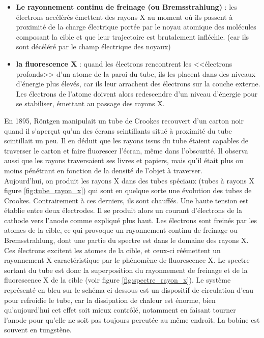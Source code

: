 \begin{itemize}
    \item \textbf{Le rayonnement continu de freinage (ou Bremsstrahlung)} : les électrons accélérés émettent des rayons X au moment où ils passent à proximité de la charge électrique portée par le noyau atomique des molécules composant la cible et que leur trajectoire est brutalement infléchie. (car ils sont décéléré par le champ électrique des noyaux)
    \item \textbf{la fluorescence X} : quand les électrons rencontrent les <<électrons profonds>> d'un atome de la paroi du tube, ils les placent dans des niveaux d'énergie plus élevés, car ils leur arrachent des électrons sur la couche externe. Les électrons de l'atome doivent alors redescendre d'un niveau d'énergie pour se stabiliser, émettant au passage des rayons X.
\end{itemize}

En 1895, Röntgen manipulait un tube de Crookes recouvert d'un carton noir quand il s'aperçut qu'un des écrans scintillants situé à proximité du tube scintillait un peu. Il en déduit que les rayons issus du tube étaient capables de traverser le carton et faire fluorescer l'écran, même dans l'obscurité. Il observa aussi que les rayons traversaient ses livres et papiers, mais qu'il était plus ou moins pénétrant en fonction de la densité de l'objet à traverser. \\

Aujourd'hui, on produit les rayons X dans des tubes spéciaux (tubes à rayons X figure \ref{fig:tube_rayon_x}) qui sont en quelque sorte une évolution des tubes de Crookes. Contrairement à ces derniers, ils sont chauffés. Une haute tension est établie entre deux électrodes. Il se produit alors un courant d'électrons de la cathode vers l'anode comme expliqué plus haut. Les électrons sont freinés par les atomes de la cible, ce qui provoque un rayonnement continu de freinage ou Bremsstrahlung, dont une partie du spectre est dans le domaine des rayons X. Ces électrons excitent les atomes de la cible, et ceux-ci réémettent un rayonnement X caractéristique par le phénomène de fluorescence X. Le spectre sortant du tube est donc la superposition du rayonnement de freinage et de la fluorescence X de la cible (voir figure \ref{fig:spectre_rayon_x}). Le système représenté en bleu sur le schéma ci-dessous est un dispositif de circulation d'eau pour refroidie le tube, car la dissipation de chaleur est énorme, bien qu'aujourd'hui cet effet soit mieux contrôlé, notamment en faisant tourner l'anode pour qu'elle ne soit pas toujours percutée au même endroit. La bobine est souvent en tungstène.

